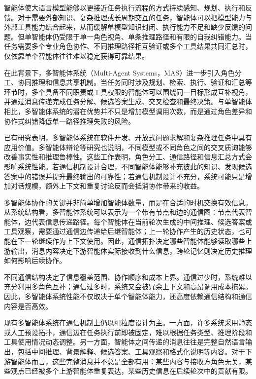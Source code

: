 智能体使大语言模型能够以更接近任务执行流程的方式持续感知、规划、执行和反馈。对于需要外部知识、复杂推理或长周期交互的任务，智能体可以把模型能力与外部工具能力结合起来，从而缓解单模型知识封闭、执行能力不足和缺少反馈的问题。但单智能体仍受限于单一角色视角、单条推理路径和有限的自我纠错能力。当任务需要多个专业角色协作、不同推理路径相互验证或多个工具结果共同汇总时，仅依靠单个智能体往往难以稳定获得可靠结果。

在此背景下，多智能体系统（Multi-Agent Systems，MAS）进一步引入角色分工、协同推理和信息共享机制\cite{ref31,ref32}。当任务同时涉及规划、检索、执行、验证和汇总等环节时，多个具备不同职责或工具权限的智能体可以围绕同一目标形成互补视角，并通过消息传递完成任务分解、候选答案生成、交叉检查和最终决策。与单智能体相比，多智能体系统的潜在优势并不只是增加模型调用次数，而是通过角色差异和协作式纠错降低单一路径推理失败的风险。

已有研究表明，多智能体系统在软件开发、开放式问题求解和复杂推理任务中具有应用价值\cite{ref9,ref35,ref36}。多智能体辩论等研究也说明，不同模型或不同角色之间的交叉质询能够改善事实性和推理鲁棒性\cite{ref31,ref34}。这些工作表明，角色分工、通信路径和信息汇总方式会影响系统性能。若通信机制设计合理，不同智能体能够补充彼此的知识、发现候选答案中的错误并提升最终输出的可靠性；若通信机制设计不充分，系统可能只是增加对话规模，额外上下文和重复讨论反而会抵消协作带来的收益。

多智能体协作的关键并非简单增加智能体数量，而是在合适的时机交换有效信息。从系统结构看，多智能体系统可以表示为一个带有节点和边的通信图：节点代表智能体，边代表信息传递路径。每个智能体在当前轮次生成的中间推理、候选答案或工具观察，需要通过通信边传递给后继智能体；上一轮协作产生的历史状态，也可能在下一轮继续作为上下文使用。因此，通信拓扑决定哪些智能体能够读取哪些上游输出，消息内容决定下游智能体实际接收到什么信息，跨轮记忆则决定历史推理如何影响后续协作。

不同通信结构决定了信息覆盖范围、协作顺序和成本上界。通信过少时，系统难以充分利用多角色互补；通信过多时，系统又会被冗余上下文和高昂调用成本拖累。因此，多智能体系统性能不仅取决于单个智能体能力，还高度依赖通信结构和通信内容是否高效。

现有多智能体系统在通信机制上仍以粗粒度设计为主。一方面，许多系统采用静态或人工预设拓扑，通信边在任务执行前即被固定，难以根据任务类型、推理阶段和工具使用情况动态调整。另一方面，智能体之间传递的消息往往是完整自然语言输出，包括中间推理、背景解释、候选答案、工具观察和格式化说明等内容。对于下游智能体而言，这些完整消息并不总是全部有用：某些内容与接收方角色无关，某些观点已经被多个上游智能体重复表达，某些历史信息在后续轮次中的贡献有限。

